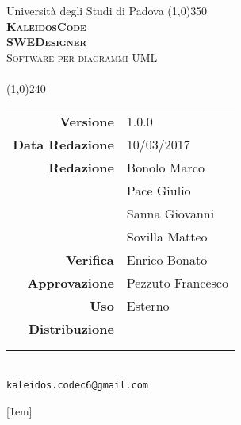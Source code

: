 \documentclass[a4paper,12pt]{article}
\author{KaleidosCode}
\date{10/03/2017}	%
\date{\today}
\begin{document}
	\begin{titlepage}
		\centering Università degli Studi di Padova
		\line(1,0){350}\\
		\vspace{0.4cm}
		{\bfseries\scshape\LARGE KaleidosCode\\}
		\vspace{0.4cm}
		{\bfseries\scshape\LARGE SWEDesigner\\}
		{\scshape\Large Software per diagrammi UML\\}
		\vspace{1cm}
		{\scshape\Large \glossarioi\ \\}		%
		\vspace{1.4cm}
		\logo
		\vspace{1.2cm}
		\line(1,0){240}\\
		\begin{tabular}{r|l}
			{\hfill \textbf{Versione}} 			& 1.0.0\\
			{\hfill \textbf{Data Redazione}} 	& 10/03/2017\\	%
			{\hfill \textbf{Redazione}} 		& Bonolo Marco\\ & Pace Giulio\\ & Sanna Giovanni\\ & Sovilla Matteo\\
			{\hfill \textbf{Verifica}} 			& Enrico Bonato\\
			{\hfill \textbf{Approvazione}} 		& Pezzuto Francesco\\
			{\hfill \textbf{Uso}} 				& Esterno\\
			{\hfill \textbf{Distribuzione}} 	& \vardanega \\ & \cardin \\ & \proponente\\
		\end{tabular}\\
		\vspace{2cm}
		\texttt{kaleidos.codec6@gmail.com}
	\end{titlepage}
	
	\pagestyle{myfront}
	\newpage
		
	\newpage
		[1em]{}{\bfseries\fontsize{0.8em}{0.8em}}{}{\contentspage}
		\tableofcontents
	\newpage
	\pagestyle{mymain}
		\titleformat{\section}[block]{\bfseries\fontsize{20pt}{20pt}\selectfont}{}{-0.8em}{}
		\printglossary[style=myaltlistgroup, title=, toctitle=Glossario dei termini]
		\glsaddall

	\label{LastPage}
\end{document}
